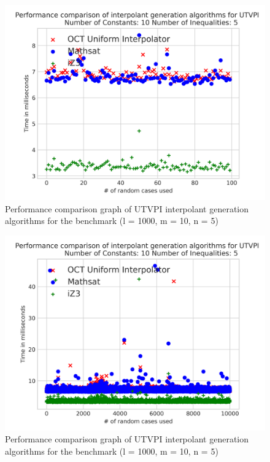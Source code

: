 \begin{figure}
  \centering
  \includegraphics[scale=0.6]{figures/octi_performance_graph_10_5_100}
  \caption{Performance comparison graph of UTVPI interpolant generation
  algorithms for the benchmark (l = 1000, m = 10, n = 5)}
  \label{performance_graph_oct}
\end{figure}

\begin{figure}
  \centering
  \includegraphics[scale=0.6]{figures/octi_performance_graph_10_5_10000}
  \caption{Performance comparison graph of UTVPI interpolant generation
  algorithms for the benchmark (l = 1000, m = 10, n = 5)} 

  \label{performance_graph_oct_2}
\end{figure}

